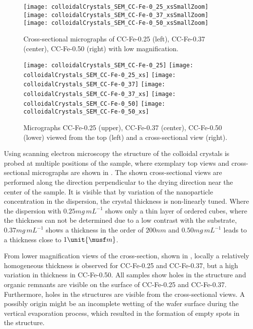 \documentclass[\main/dresen_thesis.tex]{subfiles}
\begin{document}
  \label{sec:colloidalCrystals:layers:sem}

  \begin{figure}[tb]
    \centering
    \texttt{[image: colloidalCrystals\_SEM\_CC-Fe-0\_25\_xsSmallZoom]}
    \texttt{[image: colloidalCrystals\_SEM\_CC-Fe-0\_37\_xsSmallZoom]}
    \texttt{[image: colloidalCrystals\_SEM\_CC-Fe-0\_50\_xsSmallZoom]}
    \caption{\label{fig:colloidalCrystals:structure:semLowMag}Cross-sectional micrographs of CC-Fe-0.25 (left), CC-Fe-0.37 (center), CC-Fe-0.50 (right) with low magnification.}
  \end{figure}

  \begin{figure}[tb]
    \centering
    \texttt{[image: colloidalCrystals\_SEM\_CC-Fe-0\_25]}
    \texttt{[image: colloidalCrystals\_SEM\_CC-Fe-0\_25\_xs]}
    \texttt{[image: colloidalCrystals\_SEM\_CC-Fe-0\_37]}
    \texttt{[image: colloidalCrystals\_SEM\_CC-Fe-0\_37\_xs]}
    \texttt{[image: colloidalCrystals\_SEM\_CC-Fe-0\_50]}
    \texttt{[image: colloidalCrystals\_SEM\_CC-Fe-0\_50\_xs]}
    \caption{\label{fig:colloidalCrystals:structure:sem}Micrographs CC-Fe-0.25 (upper), CC-Fe-0.37 (center), CC-Fe-0.50 (lower) viewed from the top (left) and a cross-sectional view (right). }
  \end{figure}
  Using scanning electron microscopy the structure of the colloidal crystals is probed at multiple positions of the sample, where exemplary top views and cross-sectional micrographs are shown in .
  The shown cross-sectional views are performed along the direction perpendicular to the drying direction near the center of the sample.
  It is visible that by variation of the nanoparticle concentration in the dispersion, the crystal thickness is non-linearly tuned.
  Where the dispersion with $0.25 \unit{mg \, mL^{-1}}$ shows only a thin layer of ordered cubes, where the thickness can not be determined due to a low contrast with the substrate, $0.37 \unit{mg \, mL^{-1}}$ shows a thickness in the order of $200 \unit{nm}$ and $0.50 \unit{mg \, mL^{-1}}$ leads to a thickness close to $1 \unit{\musf m}$.

  From lower magnification views of the cross-section, shown in , locally a relatively homogeneous thickness is observed for CC-Fe-0.25 and CC-Fe-0.37, but a high variation in thickness in CC-Fe-0.50.
  All samples show holes in the structure and organic remnants are visible on the surface of CC-Fe-0.25 and CC-Fe-0.37.
  Furthermore, holes in the structures are visible from the cross-sectional views.
  A possibly origin might be an incomplete wetting of the wafer surface during the vertical evaporation process, which resulted in the formation of empty spots in the structure.
\end{document}
